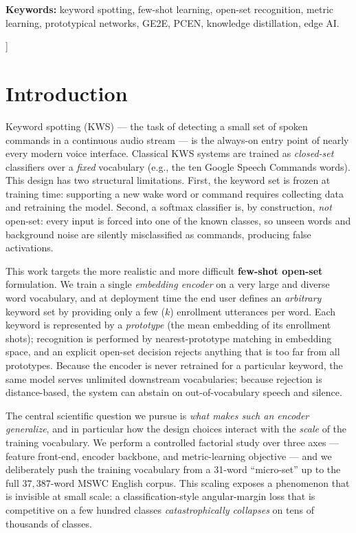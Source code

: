 \documentclass[10pt,twocolumn]{article}
\begin{document}
\begin{@twocolumnfalse}
\begin{center}
\begin{minipage}{0.92\textwidth}
\vspace{6pt}
\noindent\textbf{Keywords:} keyword spotting, few-shot learning, open-set
recognition, metric learning, prototypical networks, GE2E, PCEN, knowledge
distillation, edge AI.
\end{minipage}
\end{center}
\vspace{14pt}
\end{@twocolumnfalse}
]

\section{Introduction}\label{sec:intro}

Keyword spotting (KWS) --- the task of detecting a small set of spoken commands
in a continuous audio stream --- is the always-on entry point of nearly every
modern voice interface. Classical KWS systems are trained as \emph{closed-set}
classifiers over a \emph{fixed} vocabulary (e.g., the ten Google Speech Commands
words). This design has two structural limitations. First, the keyword set is
frozen at training time: supporting a new wake word or command requires
collecting data and retraining the model. Second, a softmax classifier is, by
construction, \emph{not} open-set: every input is forced into one of the known
classes, so unseen words and background noise are silently misclassified as
commands, producing false activations.

This work targets the more realistic and more difficult
\textbf{few-shot open-set} formulation. We train a single \emph{embedding
encoder} on a very large and diverse word vocabulary, and at deployment time the
end user defines an \emph{arbitrary} keyword set by providing only a few
($k$) enrollment utterances per word. Each keyword is represented by a
\emph{prototype} (the mean embedding of its enrollment shots); recognition is
performed by nearest-prototype matching in embedding space, and an explicit
open-set decision rejects anything that is too far from all prototypes. Because
the encoder is never retrained for a particular keyword, the same model serves
unlimited downstream vocabularies; because rejection is distance-based, the
system can abstain on out-of-vocabulary speech and silence.

The central scientific question we pursue is \emph{what makes such an encoder
generalize}, and in particular how the design choices interact with the
\emph{scale} of the training vocabulary. We perform a controlled factorial study
over three axes --- feature front-end, encoder backbone, and metric-learning
objective --- and we deliberately push the training vocabulary from a 31-word
``micro-set'' up to the full $37{,}387$-word MSWC English corpus. This scaling
exposes a phenomenon that is invisible at small scale: a classification-style
angular-margin loss that is competitive on a few hundred classes
\emph{catastrophically collapses} on tens of thousands of classes.
\end{document}
